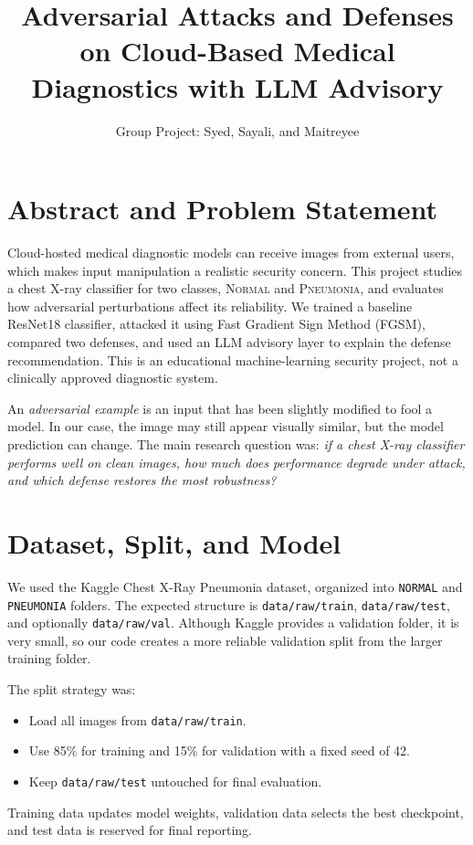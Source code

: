 ﻿\documentclass[10pt]{article}
\title{\vspace{-1.4em}\textbf{Adversarial Attacks and Defenses on Cloud-Based Medical Diagnostics with LLM Advisory}}
\author{Group Project: Syed, Sayali, and Maitreyee}
\date{}
\begin{document}
\maketitle
\vspace{-1.7em}

\section{Abstract and Problem Statement}
Cloud-hosted medical diagnostic models can receive images from external users, which makes input manipulation a realistic security concern. This project studies a chest X-ray classifier for two classes, \textsc{Normal} and \textsc{Pneumonia}, and evaluates how adversarial perturbations affect its reliability. We trained a baseline ResNet18 classifier, attacked it using Fast Gradient Sign Method (FGSM), compared two defenses, and used an LLM advisory layer to explain the defense recommendation. This is an educational machine-learning security project, not a clinically approved diagnostic system.

An \textit{adversarial example} is an input that has been slightly modified to fool a model. In our case, the image may still appear visually similar, but the model prediction can change. The main research question was: \textit{if a chest X-ray classifier performs well on clean images, how much does performance degrade under attack, and which defense restores the most robustness?}

\section{Dataset, Split, and Model}
We used the Kaggle Chest X-Ray Pneumonia dataset, organized into \texttt{NORMAL} and \texttt{PNEUMONIA} folders. The expected structure is \texttt{data/raw/train}, \texttt{data/raw/test}, and optionally \texttt{data/raw/val}. Although Kaggle provides a validation folder, it is very small, so our code creates a more reliable validation split from the larger training folder.

The split strategy was:
\begin{itemize}
    \item Load all images from \texttt{data/raw/train}.
    \item Use 85\% for training and 15\% for validation with a fixed seed of 42.
    \item Keep \texttt{data/raw/test} untouched for final evaluation.
\end{itemize}
Training data updates model weights, validation data selects the best checkpoint, and test data is reserved for final reporting.
\end{document}
